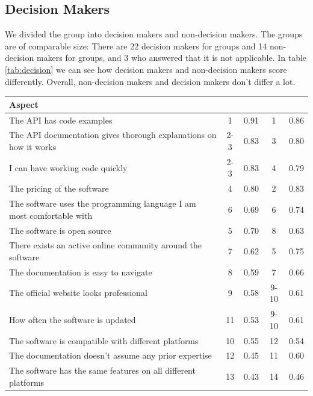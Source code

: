 \documentclass{cslthse-msc}
\begin{document}
    \subsection{Decision Makers}
    We divided the group into decision makers and non-decision makers. The
    groups are of comparable size: There are 22 decision makers for groups
    and 14 non-decision makers for groups, and 3 who answered that it is not
    applicable. In table \ref{tab:decision} we can see how decision makers and non-decision makers score differently.
    Overall, non-decision makers and decision makers don't differ a lot.
    \begin{table}[H]
        \centering
        \begin{tabularx}{\columnwidth}{X|c:c|c:c|}
            \textbf{Aspect}	&\textbf{}&\textbf{}&\textbf{}&\textbf{}	\\ \hline
            The API has code examples	&	1	&	0.91	&	1	&	0.86	\\ \hline
            The API documentation gives thorough explanations on how it works	&	2-3	&	0.83	&	3	&	0.80	\\ \hline
            I can have working code quickly	&	2-3	&	0.83	&	4	&	0.79	\\ \hline
            The pricing of the software	&	4	&	0.80	&	2	&	0.83	\\ \hline
            The software uses the programming language I am most comfortable with	&	6	&	0.69	&	6	&	0.74	\\ \hline
            The software is open source	&	5	&	0.70	&	8	&	0.63	\\ \hline
            There exists an active online community around the software	&	7	&	0.62	&	5	&	0.75	\\ \hline
            The documentation is easy to navigate	&	8	&	0.59	&	7	&	0.66	\\ \hline
            The official website looks professional	&	9	&	0.58	&	9-10	&	0.61	\\ \hline
            How often the software is updated	&	11	&	0.53	&	9-10	&	0.61	\\ \hline
            The software is compatible with different platforms	&	10	&	0.55	&	12	&	0.54	\\ \hline
            The documentation doesn't assume any prior expertise	&	12	&	0.45	&	11	&	0.60	\\ \hline
            The software has the same features on all different platforms	&	13	&	0.43	&	14	&	0.46	\\ \hline

\end{tabularx}
\end{table}
\end{document}
